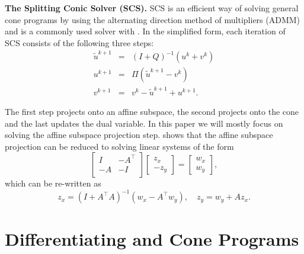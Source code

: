 \textbf{The Splitting Conic Solver (SCS).}
SCS \citep{odonoghue2016conic} is an efficient way of solving
general cone programs by using the alternating
direction method of multipliers (ADMM)
\citep{boyd2011distributed} and is a commonly used
solver with \cvxpy.
In the simplified form, each iteration
of SCS consists of the following three steps:
\begin{equation}
\begin{array}{rcl}
\tilde u^{k+1} &=& (I + Q)^{-1} (u^k + v^k )\\[1ex]
u^{k+1} &=& \Pi\left(\tilde u^{k+1} - v^k\right) \\[1ex]
v^{k+1} &=&  v^k - \tilde u^{k+1} + u^{k+1}.
\end{array}
\label{eq:scs}
\end{equation}

The first step projects onto an affine subspace,
the second projects onto the cone
and the last updates the dual variable.
In this paper we will mostly focus on solving the
affine subspace projection step. \citet[Section 4.1]{odonoghue2016conic}
shows that the affine subspace projection can be
reduced to solving linear systems of the form
\begin{equation}
\label{eq:scs-linsys}
\begin{bmatrix}
I & -A^\top \\
-A & -I  \\
\end{bmatrix}
\begin{bmatrix} z_x \\ -z_y \end{bmatrix}
=
\begin{bmatrix} w_x \\ w_y \end{bmatrix},
\end{equation}
which can be re-written as
\begin{equation}
  \label{eq:scs-linsys-elim}
  z_x = (I + A^\top A)^{-1}(w_x - A^\top w_y), \quad
  z_y = w_y + A z_x.
\end{equation}

\section{Differentiating \cvxpy and Cone Programs}
\label{sec:cvxpyth:diff-cp}

